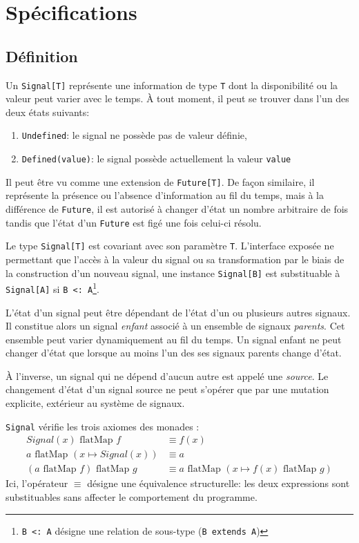 \section{Spécifications}

\subsection{Définition}
Un \texttt{Signal[T]} représente une information de type \texttt{T} dont la disponibilité ou la valeur peut varier avec le temps. À tout moment, il peut se trouver dans l'un des deux états suivants:
\begin{enumerate}
	\item \texttt{Undefined}: le signal ne possède pas de valeur définie,
	\item \texttt{Defined(value)}: le signal possède actuellement la valeur \texttt{value}
\end{enumerate}

Il peut être vu comme une extension de \texttt{Future[T]}. De façon similaire, il représente la présence ou l'absence d'information au fil du temps, mais à la différence de \texttt{Future}, il est autorisé à changer d'état un nombre arbitraire de fois tandis que l'état d'un \texttt{Future} est figé une fois celui-ci résolu.

Le type \texttt{Signal[T]} est covariant avec son paramètre \texttt{T}. L'interface exposée ne permettant que l'accès à la valeur du signal ou sa transformation par le biais de la construction d'un nouveau signal, une instance \texttt{Signal[B]} est substituable à \texttt{Signal[A]} si \texttt{B <: A}\footnote{\texttt{B <: A} désigne une relation de sous-type (\texttt{B extends A})}.

L'état d'un signal peut être dépendant de l'état d'un ou plusieurs autres signaux. Il constitue alors un signal \emph{enfant} associé à un ensemble de signaux \emph{parents}. Cet ensemble peut varier dynamiquement au fil du temps. Un signal enfant ne peut changer d'état que lorsque au moins l'un des ses signaux parents change d'état.

À l'inverse, un signal qui ne dépend d'aucun autre est appelé une \emph{source}. Le changement d'état d'un signal source ne peut s'opérer que par une mutation explicite, extérieur au système de signaux.

\texttt{Signal} vérifie les trois axiomes des monades \cite{haskell-monad-laws}:
\begin{align*}
Signal(x) \text{ flatMap } f &\equiv f(x) \\
a \text{ flatMap } (x \mapsto Signal(x)) &\equiv a \\
(a \text{ flatMap } f)  \text{ flatMap } g &\equiv
a \text{ flatMap } (x \mapsto f(x)  \text{ flatMap } g) 
\end{align*}
Ici, l'opérateur $\equiv$ désigne une équivalence structurelle: les deux expressions sont substituables sans affecter le comportement du programme.

